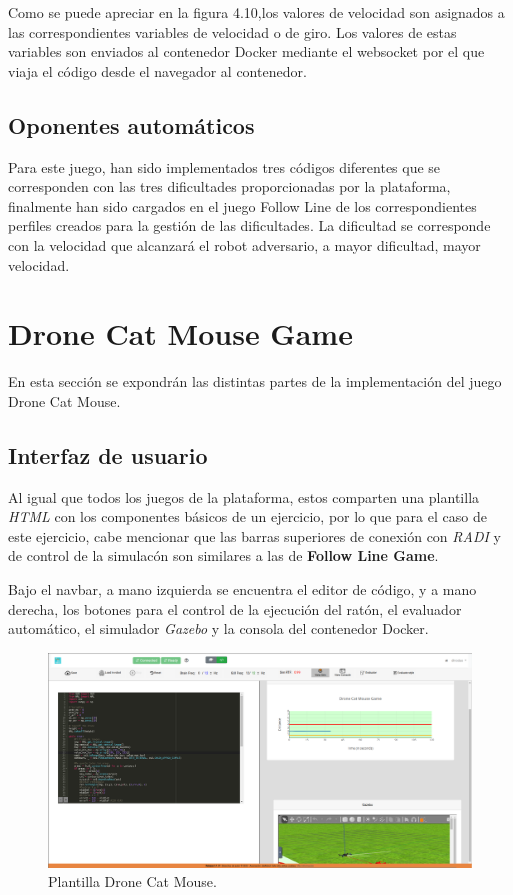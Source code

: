\documentclass[a4paper, 12pt]{book}
\begin{document}
Como se puede apreciar en la figura 4.10,los valores de velocidad son asignados a las correspondientes variables de velocidad o de giro. Los valores de estas variables son enviados al contenedor Docker mediante el websocket por el que viaja el código desde el navegador al contenedor.

\subsection{Oponentes automáticos}

Para este juego, han sido implementados tres códigos diferentes que se corresponden con las tres dificultades proporcionadas por la plataforma, finalmente han sido cargados en el juego Follow Line de los correspondientes perfiles creados para la gestión de las dificultades. La dificultad se corresponde con la velocidad que alcanzará el robot adversario, a mayor dificultad, mayor velocidad.

\section{Drone Cat Mouse Game} 
\label{sec:drone_cat_mouse_game}

En esta sección se expondrán las distintas partes de la implementación del juego Drone Cat Mouse.

\subsection{Interfaz de usuario}
\label{drone_cat_mouse_interface}

Al igual que todos los juegos de la plataforma, estos comparten una plantilla \emph{HTML} con los componentes básicos de un ejercicio, por lo que para el caso de este ejercicio, cabe mencionar que las barras superiores de conexión con \emph{RADI} y de control de la simulacón son similares a las de \textbf{Follow Line Game}.

Bajo el navbar, a mano izquierda se encuentra el editor de código, y a mano derecha, los botones para el control de la ejecución del ratón, el evaluador automático, el simulador \emph{Gazebo} y la consola del contenedor Docker.


\begin{figure}[H]
	\centering
    \includegraphics[width=15cm]{img/drone_cat_mouse.png}
    \caption{Plantilla Drone Cat Mouse.}
    \label{figura:keyhandler}
\end{figure}
\end{document}
